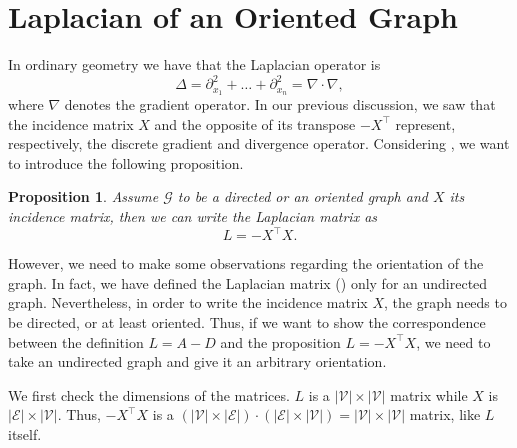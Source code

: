 \documentclass[12pt,a4paper]{report}
\newtheorem{proposition}{Proposition}[chapter]
\theoremstyle{definition}
\begin{document}
\section{Laplacian of an Oriented Graph}
\label{sec:laplacian_oriented_graph}

In ordinary geometry we have that the Laplacian operator is 
\begin{equation}
\label{eq:classic_lapl}
   \Delta = \partial_{x_1}^2 + \ldots + \partial_{x_n} ^2 = \nabla \cdot \nabla ,
\end{equation}
where $\nabla$ denotes the gradient operator.
In our previous discussion, we saw that the incidence matrix $X$ and the opposite of its transpose $-X^\top$ represent, respectively, the discrete gradient and divergence operator.
Considering , we want to introduce the following proposition.
\begin{proposition}
\label{prop:laplacian}
Assume $\mathcal{G}$ to be a directed or an oriented graph and $X$ its incidence matrix, then we can write the Laplacian matrix as
\begin{equation*}
    L = -X^\top X .
\end{equation*}
\end{proposition}
However, we need to make some observations regarding the orientation of the graph.
In fact, we have defined the Laplacian matrix () only for an undirected graph.
Nevertheless, in order to write the incidence matrix $X$, the graph needs to be directed, or at least oriented.
Thus, if we want to show the correspondence between the definition $L=A-D$ and the proposition $L=-X^\top X$, we need to take an undirected graph and give it an arbitrary orientation.

We first check the dimensions of the matrices.
$L$ is a $|\mathcal{V}| \times |\mathcal{V}|$ matrix while $X$ is $|\mathcal{E}| \times |\mathcal{V}|$.
Thus, $-X^\top X$ is a $(|\mathcal{V}| \times |\mathcal{E}|) \cdot (|\mathcal{E}| \times |\mathcal{V}|) = |\mathcal{V}| \times |\mathcal{V}|$ matrix, like $L$ itself.
\end{document}
